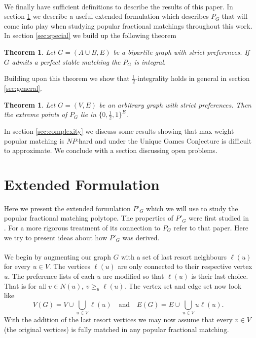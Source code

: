 \documentclass[letterpaper,12pt,oneside,onecolumn]{article}
\newtheorem{theorem}[fact]{Theorem}
\begin{document}
\paragraph{}
We finally have sufficient definitions to describe the results of this paper. In section \ref{sec:formulation} we describe a useful extended formulation which describes $P_G$ that will come into play when studying popular fractional matchings throughout this work. In section \ref{sec:special} we build up the following theorem
\begin{theorem}\label{th:special}
Let $G = (A \cup B, E)$ be a bipartite graph with strict preferences. If $G$ admits a perfect stable matching the $P_G$ is integral.
\end{theorem}
Building upon this theorem we show that $\frac{1}{2}$-integrality holds in general in section \ref{sec:general}.
\begin{theorem}
Let $G=(V,E)$ be an arbitrary graph with strict preferences. Then the extreme points of $P_G$ lie in $\{0,\frac{1}{2}, 1\}^E$.
\end{theorem}
In section \ref{sec:complexity} we discuss some results showing that max weight popular matching is $NP$-hard and under the Unique Games Conjecture is difficult to approximate. We conclude with a section discussing open problems.
\section{Extended Formulation}\label{sec:formulation}

\paragraph{}
Here we present the extended formulation $P'_G$ which we will use to study the popular fractional matching polytope. The properties of $P'_G$ were first studied in \cite{kavitha2011popular}. For a more rigorous treatment of its connection to $P_G$ refer to that paper. Here we try to present ideas about how $P'_G$ was derived.

\paragraph{}
We begin by augmenting our graph $G$ with a set of last resort neighbours $\ell(u)$ for every $u \in V$. The vertices $\ell(u)$ are only connected to their respective vertex $u$. The preference lists of each $u$ are modified so that $\ell(u)$ is their last choice. That is for all $v \in N(u)$, $v \geq_u \ell(u)$. The vertex set and edge set now look like
$$V(G) = V \cup \bigcup_{u \in V} \ell(u) \quad\text{and}\quad E(G) = E \cup \bigcup_{u \in V} u\ell(u).$$  With the addition of the last resort vertices we may now assume that every $v \in V$ (the original vertices) is fully matched in any popular fractional matching.
\end{document}
